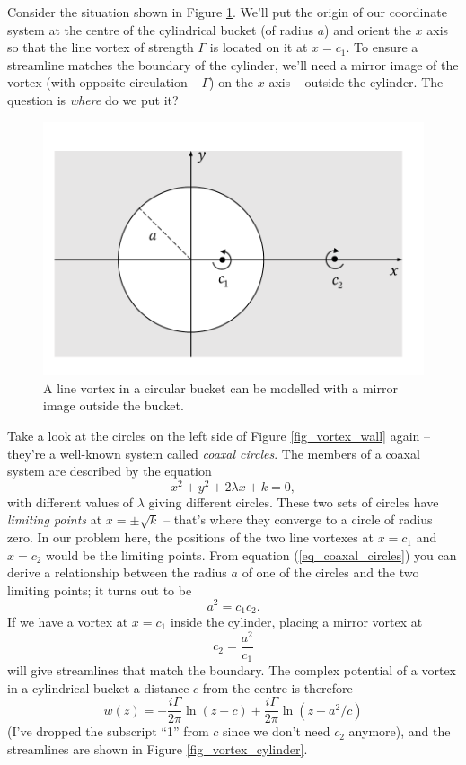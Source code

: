 Consider the situation shown in Figure \ref{fig_circular_boundary}.  We'll put the origin of our coordinate system at the centre of the cylindrical bucket (of radius $a$) and orient the $x$ axis so that the line vortex of strength $\Gamma$ is located on it at $x = c_1$.  To ensure a streamline matches the boundary of the cylinder, we'll need a mirror image of the vortex (with opposite circulation $-\Gamma$) on the $x$ axis -- outside the cylinder.  The question is \emph{where} do we put it?

\begin{figure}
\centering\includegraphics[width=0.75\linewidth]{Figures/Chapter4/fig_circular_boundary}
\caption{A line vortex in a circular bucket can be modelled with a mirror image outside the bucket.}
\label{fig_circular_boundary}
\end{figure}

Take a look at the circles on the left side of Figure \ref{fig_vortex_wall} again -- they're a well-known system called \emph{coaxal circles}.  The members of a coaxal system are described by the equation
\begin{equation}
\label{eq_coaxal_circles}
x^2 + y^2 + 2\lambda x + k = 0,
\end{equation}
with different values of $\lambda$ giving different circles.  These two sets of circles have \emph{limiting points} at $x = \pm \sqrt{k}$ -- that's where they converge to a circle of radius zero.  In our problem here, the positions of the two line vortexes at $x=c_1$ and $x=c_2$ would be the limiting points. From equation (\ref{eq_coaxal_circles}) you can derive a relationship between the radius $a$ of one of the circles and the two limiting points; it turns out to be
\[
a^2 = c_1 c_2.
\]
If we have a vortex at $x=c_1$ inside the cylinder, placing a mirror vortex at 
\begin{equation}
c_2 = \frac{a^2}{c_1}
\end{equation}
will give streamlines that match the boundary.  The complex potential of a vortex in a cylindrical bucket a distance $c$ from the centre is therefore
\begin{equation}
w(z) = -\frac{i\Gamma}{2\pi} \ln (z-c) + \frac{i\Gamma}{2\pi} \ln (z-a^2/c)
\end{equation}
(I've dropped the subscript ``1'' from $c$ since we don't need $c_2$ anymore), and the streamlines are shown in Figure \ref{fig_vortex_cylinder}.

